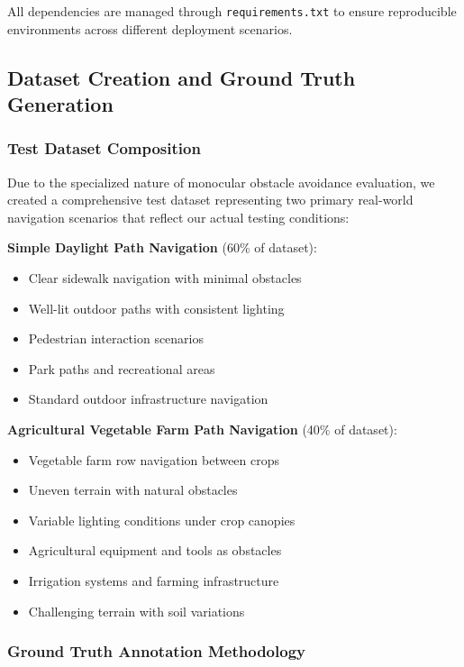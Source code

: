 \documentclass[10pt]{article}
\begin{document}
All dependencies are managed through \texttt{requirements.txt} to ensure reproducible environments across different deployment scenarios.

\subsection{Dataset Creation and Ground Truth Generation}

\subsubsection{Test Dataset Composition}

Due to the specialized nature of monocular obstacle avoidance evaluation, we created a comprehensive test dataset representing two primary real-world navigation scenarios that reflect our actual testing conditions:

\textbf{Simple Daylight Path Navigation} (60\% of dataset):
\begin{itemize}
\item Clear sidewalk navigation with minimal obstacles
\item Well-lit outdoor paths with consistent lighting
\item Pedestrian interaction scenarios
\item Park paths and recreational areas
\item Standard outdoor infrastructure navigation
\end{itemize}

\textbf{Agricultural Vegetable Farm Path Navigation} (40\% of dataset):
\begin{itemize}
\item Vegetable farm row navigation between crops
\item Uneven terrain with natural obstacles
\item Variable lighting conditions under crop canopies
\item Agricultural equipment and tools as obstacles
\item Irrigation systems and farming infrastructure
\item Challenging terrain with soil variations
\end{itemize}

\subsubsection{Ground Truth Annotation Methodology}
\end{document}
